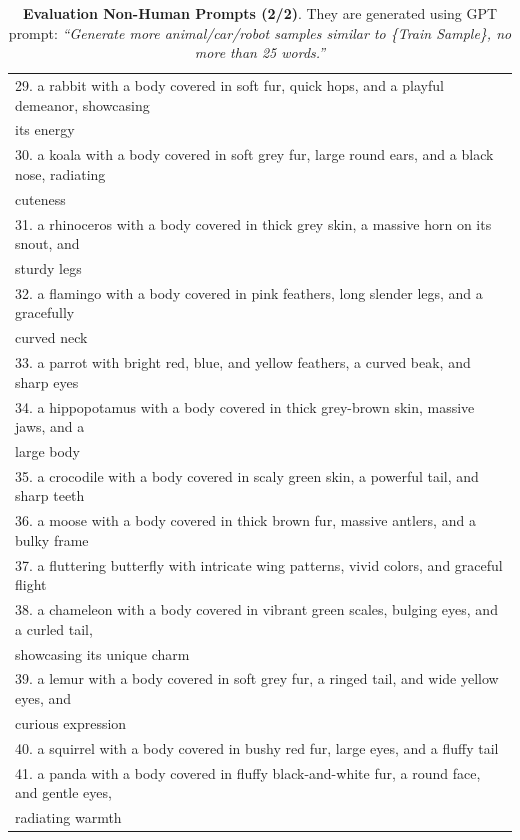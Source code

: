 \begin{table}[!ht]

\caption{\textbf{Evaluation Non-Human Prompts (2/2)}. They are generated using GPT prompt: \textit{``Generate more animal/car/robot samples similar to \{Train Sample\}, no more than 25 words.''}}
\label{tab:nonhuman_prompts_2}

\begin{threeparttable}
\resizebox{.99\textwidth}{!} 
{
\begin{tabular}{l}
\toprule
29. a rabbit with a body covered in soft fur, quick hops, and a playful demeanor, showcasing \\ \quad its energy \\
30. a koala with a body covered in soft grey fur, large round ears, and a black nose, radiating \\ \quad cuteness \\
31. a rhinoceros with a body covered in thick grey skin, a massive horn on its snout, and \\ \quad sturdy legs \\
32. a flamingo with a body covered in pink feathers, long slender legs, and a gracefully \\ \quad curved neck \\
33. a parrot with bright red, blue, and yellow feathers, a curved beak, and sharp eyes \\
34. a hippopotamus with a body covered in thick grey-brown skin, massive jaws, and a \\ \quad large body \\
35. a crocodile with a body covered in scaly green skin, a powerful tail, and sharp teeth \\
36. a moose with a body covered in thick brown fur, massive antlers, and a bulky frame \\
37. a fluttering butterfly with intricate wing patterns, vivid colors, and graceful flight \\
38. a chameleon with a body covered in vibrant green scales, bulging eyes, and a curled tail, \\ \quad showcasing its unique charm \\
39. a lemur with a body covered in soft grey fur, a ringed tail, and wide yellow eyes, and \\ \quad curious expression \\
40. a squirrel with a body covered in bushy red fur, large eyes, and a fluffy tail \\
41. a panda with a body covered in fluffy black-and-white fur, a round face, and gentle eyes, \\ \quad radiating warmth \\

\end{tabular}}
\end{threeparttable}
\end{table}
